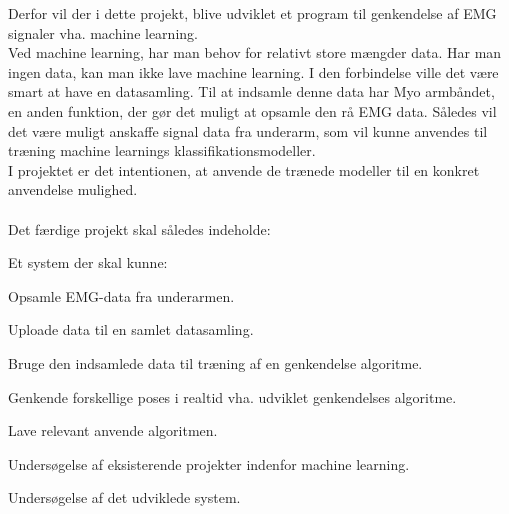 Derfor vil der i dette projekt, blive udviklet et program til genkendelse af EMG signaler vha. machine learning. \\
Ved machine learning, har man behov for relativt store mængder data. Har man ingen data, kan man ikke lave machine learning. I den forbindelse ville det være smart at have en datasamling. Til at indsamle denne data har Myo armbåndet, en anden funktion, der gør det muligt at opsamle den rå EMG data. Således vil det være muligt anskaffe signal data fra underarm, som vil kunne anvendes til træning machine learnings klassifikationsmodeller. \\
I projektet er det intentionen, at anvende de trænede modeller til en konkret anvendelse mulighed. \\\\
Det færdige projekt skal således indeholde:
\begin{myItemize}
\item Et system der skal kunne:
	\begin{myItemize}
		\item Opsamle EMG-data fra underarmen.
		\item Uploade data til en samlet datasamling.
		\item Bruge den indsamlede data til træning af en genkendelse algoritme.
		\item Genkende forskellige poses i realtid vha. udviklet genkendelses algoritme.
		\item Lave relevant anvende algoritmen.
	\end{myItemize}
\item Undersøgelse af eksisterende projekter indenfor machine learning.
\item Undersøgelse af det udviklede system.
\end{myItemize}
